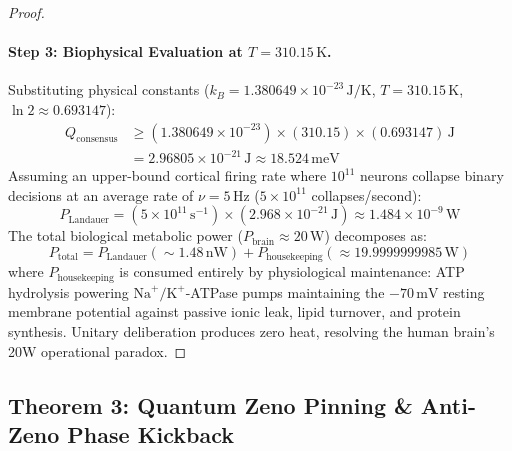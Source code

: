 \documentclass[10pt,twocolumn,3p]{article}
\begin{document}
\begin{proof}
\paragraph{Step 3: Biophysical Evaluation at $T = 310.15\,\text{K}$.}
Substituting physical constants ($k_B = 1.380649 \times 10^{-23}\,\text{J/K}$, $T = 310.15\,\text{K}$, $\ln 2 \approx 0.693147$):
\begin{align}
    Q_{\text{consensus}} &\ge (1.380649 \times 10^{-23}) \times (310.15) \times (0.693147)\,\text{J} \nonumber \\
    &= 2.96805 \times 10^{-21}\,\text{J} \approx 18.524\,\text{meV}
\end{align}
Assuming an upper-bound cortical firing rate where $10^{11}$ neurons collapse binary decisions at an average rate of $\nu = 5\,\text{Hz}$ ($5 \times 10^{11}$ collapses/second):
\begin{equation}
    P_{\text{Landauer}} = (5 \times 10^{11}\,\text{s}^{-1}) \times (2.968 \times 10^{-21}\,\text{J}) \approx 1.484 \times 10^{-9}\,\text{W}
\end{equation}
The total biological metabolic power ($P_{\text{brain}} \approx 20\,\text{W}$) decomposes as:
\begin{equation}
    P_{\text{total}} = P_{\text{Landauer}} (\sim 1.48\,\text{nW}) + P_{\text{housekeeping}} (\approx 19.9999999985\,\text{W})
\end{equation}
where $P_{\text{housekeeping}}$ is consumed entirely by physiological maintenance: ATP hydrolysis powering $\text{Na}^+/\text{K}^+$-ATPase pumps maintaining the $-70\,\text{mV}$ resting membrane potential against passive ionic leak, lipid turnover, and protein synthesis. Unitary deliberation produces zero heat, resolving the human brain's 20W operational paradox.
\end{proof}

\subsection{Theorem 3: Quantum Zeno Pinning \& Anti-Zeno Phase Kickback}
\label{subsec:theorem3}
\end{document}
